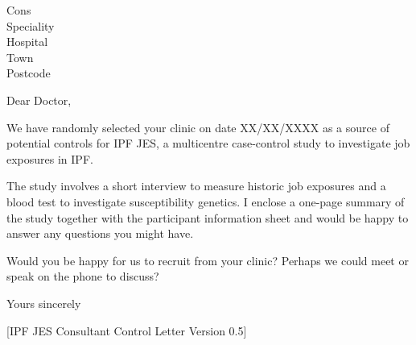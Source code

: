 \documentclass[ipfjes-centre,letterpaper,pagesize,UScommercial9]{scrlttr2}
\begin{document}
\begin{letter}{Cons \\ Speciality \\ Hospital \\ Town \\ Postcode}


\opening{Dear Doctor,}

    We have randomly selected your clinic on date XX/XX/XXXX as a source of potential controls for IPF JES, a multicentre case-control study to investigate job exposures in IPF.
    
    The study involves a short interview to measure historic job exposures and a blood test to investigate susceptibility genetics. I enclose a one-page summary of the study together with the participant information sheet and would be happy to answer any questions you might have.
    
    Would you be happy for us to recruit from your clinic? Perhaps we could meet or speak on the phone to discuss?


\closing{Yours sincerely}

     \vfill \hfill [IPF JES Consultant Control Letter Version 0.5]

\end{letter}
\end{document}

